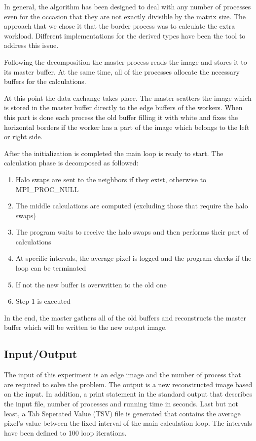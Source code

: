 \documentclass[12pt,a4paper]{article}
\begin{document}
        In general, the algorithm has been designed to deal with any number of processes even for the occasion that they are not exactly divisible by the matrix size. The approach that we chose it that the border process was to calculate the extra workload. Different implementations for the derived types have been the tool to address this issue.

        Following the decomposition the master process reads the image and stores it to its master buffer. At the same time, all of the processes allocate the necessary buffers for the calculations.

        At this point the data exchange takes place. The master scatters the image which is stored in the master buffer directly to the edge buffers of the workers. When this part is done each process the old buffer filling it with white and fixes the horizontal borders if the worker has a part of the image which belongs to the left or right side.

        After the initialization is completed the main loop is ready to start. The calculation phase is decomposed as followed:
        \begin{enumerate}
          \item Halo swaps are sent to the neighbors if they exist, otherwise to MPI\_PROC\_NULL
          \item The middle calculations are computed (excluding those that require the halo swaps)
          \item The program waits to receive the halo swaps and then performs their part of calculations
          \item At specific intervals, the average pixel is logged and the program checks if the loop can be terminated
          \item If not the new buffer is overwritten to the old one
          \item Step 1 is executed
        \end{enumerate}

        In the end, the master gathers all of the old buffers and reconstructs the master buffer which will be written to the new output image.

    \subsection{Input/Output}
        The input of this experiment is an edge image and the number of process that are required to solve the problem. The output is a new reconstructed image based on the input. In addition, a print statement in the standard output that describes the input file, number of processes and running time in seconds. Last but not least, a Tab Seperated Value (TSV) file is generated that contains the average pixel's value between the fixed interval of the main calculation loop. The intervals have been defined to 100 loop iterations.
\end{document}
